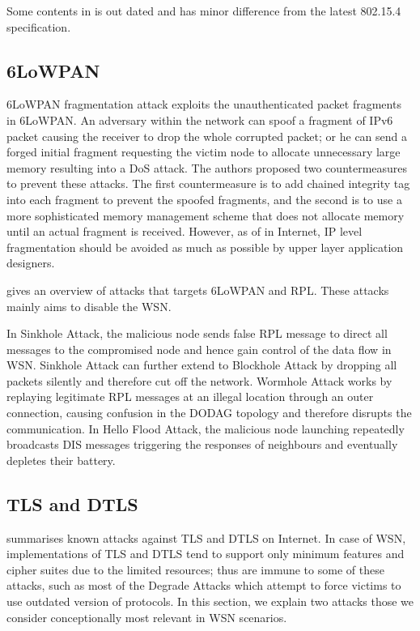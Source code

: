Some contents in \cite{802154sec} is out dated and has minor difference from the latest 802.15.4 specification.

\subsection{6LoWPAN}
6LoWPAN fragmentation attack\cite{6lpFragAtk} exploits the unauthenticated packet fragments in 6LoWPAN. An adversary within the network can spoof a fragment of IPv6 packet causing the receiver to drop the whole corrupted  packet; or he can send a forged initial fragment requesting the victim node to allocate unnecessary large memory resulting into a DoS attack. The authors proposed two countermeasures to prevent these  attacks. The first countermeasure is to add chained integrity tag into each fragment to prevent the spoofed fragments, and the second is to use a more sophisticated memory management scheme that does not allocate memory until an actual fragment is received. However, as of in Internet, IP level fragmentation should be avoided as much as possible by upper layer application designers.

\cite{6lpRplAtk} gives an overview of attacks that targets 6LoWPAN and RPL. These attacks mainly aims to disable the WSN. 

In Sinkhole Attack\cite{Sinkhole}, the malicious node sends false RPL message to direct all messages to the compromised node and hence gain control of the data flow in WSN. Sinkhole Attack can further extend to Blockhole Attack\cite{Blackhole} by dropping all packets silently and therefore cut off the network. Wormhole Attack\cite{Wormhole} works by replaying legitimate RPL messages at an illegal location through an outer connection, causing confusion in the DODAG topology and therefore disrupts the communication. In Hello Flood Attack\cite{HelloFlood}, the malicious node launching repeatedly broadcasts DIS messages triggering the responses of neighbours and eventually depletes their battery.

\subsection{TLS and DTLS}

\cite{rfc7457} summarises known attacks  against TLS and DTLS on Internet. In case of WSN, implementations of TLS and DTLS tend to support only minimum features and cipher suites due to the limited resources; thus are immune to some of these attacks, such as most of the Degrade Attacks\cite{rfc7457} which attempt to force victims to use outdated version of protocols. In this section, we explain two attacks those we consider conceptionally most relevant in WSN scenarios.

